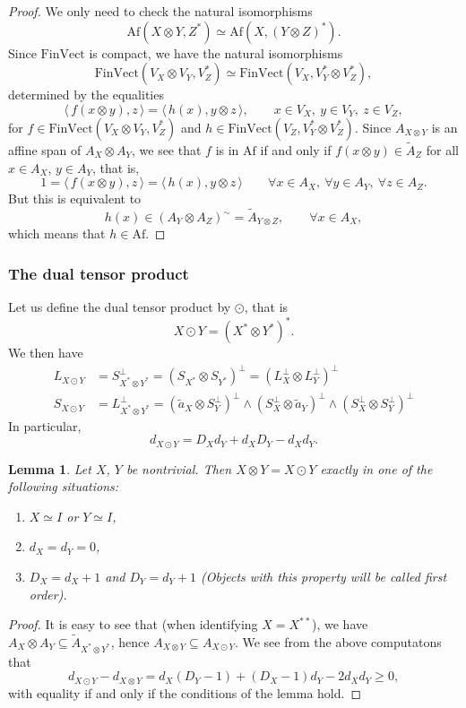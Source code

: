 \documentclass[12pt]{article}
\newtheorem{lemma}{Lemma}
\theoremstyle{definition}
\theoremstyle{remark}
\def\<{\langle\,}
\def\>{\,\rangle}
\def \Af{\mathrm{Af}}
\def \FV{\mathrm{FinVect}}
\begin{document}
\begin{proof} We only need to check the natural isomorphisms 
\[
\Af(X\otimes Y,Z^*)\simeq \Af(X,(Y\otimes Z)^*).
\]
Since $\FV$ is compact, we have the natural isomorphisms
\[
\FV(V_X\otimes V_Y,V^*_Z)\simeq \FV(V_X,V_Y^*\otimes V_Z^*),
\]
determined by the equalities
\[
\<f(x\otimes y),z\>=\<h(x),y\otimes z\>,\qquad x\in V_X,\ y\in V_Y,\ z\in V_Z,
\]
for $f\in \FV(V_X\otimes V_Y,V_Z^*)$ and $h\in \FV(V_Z,V_Y^*\otimes V_Z^*)$. Since
$A_{X\otimes Y}$ is an affine span of $A_X\otimes A_Y$, we see that
$f$ is in $\Af$ if and only if $f(x\otimes y)\in \tilde A_Z$ for all $x\in A_X$, $y\in
A_Y$, that is, 
\[
1=\<f(x\otimes y),z\>=\<h(x),y\otimes z\>\qquad \forall x\in A_X,\
\forall y\in A_Y,\ \forall z\in A_Z.
\]
But this is equivalent to
\[
h(x)\in (A_Y\otimes A_Z)^\sim=\tilde A_{Y\otimes Z},\qquad \forall x\in A_X,
\]
which means that $h\in \Af$.

\end{proof}

\subsubsection{The dual tensor product}

Let us define the dual tensor product by $\odot$, that is
\[
X\odot Y=(X^*\otimes Y^*)^*.
\]
We then have
\begin{align*}
L_{X\odot Y}&=S^\perp_{X^*\otimes Y^*}=(S_{X^*}\otimes S_{Y^*})^\perp=(L_X^\perp\otimes
L_Y^\perp)^\perp\\
S_{X\odot Y}&= L_{X^*\otimes Y^*}^\perp=(\tilde a_X\otimes
S_Y^\perp)^\perp\wedge(S_X^\perp\otimes \tilde a_Y)^\perp\wedge (S_X^\perp\otimes
S_Y^\perp)^\perp
\end{align*}
In particular,
\[
d_{X\odot Y}=D_Xd_Y+d_XD_Y-d_Xd_Y.
\]
\begin{lemma}\label{lemma:tensors} Let $X$, $Y$ be nontrivial. Then $X\otimes Y=X\odot Y$
exactly in one of the following situations:
\begin{enumerate}
\item $X\simeq I$ or $Y\simeq I$,
\item $d_X=d_Y=0$,
\item $D_X=d_X+1$ and $D_Y=d_Y+1$ (Objects with this property will be called
first order).
\end{enumerate}

\end{lemma}

\begin{proof} It is easy to see that (when identifying $X=X^{**}$), we have $A_X\otimes
A_Y\subseteq \tilde A_{X^*\otimes  Y^*}$, hence $A_{X\otimes Y}\subseteq A_{X\odot Y}$. We see from the above computatons that
\[
d_{X\odot Y}-d_{X\otimes Y}=d_X(D_Y-1)+(D_X-1)d_Y-2d_Xd_Y\ge 0,
\]
with equality if and only if the conditions of the lemma hold.

\end{proof}
\end{document}
